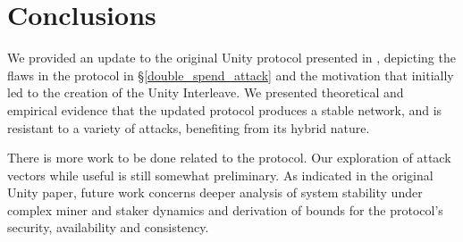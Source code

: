\section{Conclusions}

We provided an update to the original Unity protocol presented in \cite{wu2019unifying},
depicting the flaws in the protocol in \S\ref{double_spend_attack} and the motivation
that initially led to the creation of the Unity Interleave. We presented theoretical
and empirical evidence that the updated protocol produces a stable network, and is
resistant to a variety of attacks, benefiting from its hybrid nature.

There is more work to be done related to the protocol. Our exploration of attack vectors
while useful is still somewhat preliminary. As indicated in the original Unity paper, future work concerns deeper analysis of system stability under complex miner and staker dynamics and derivation of bounds for the protocol's security, availability and consistency. 